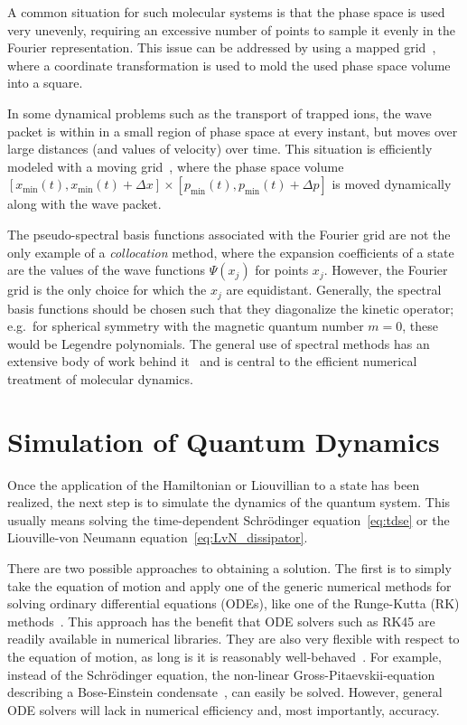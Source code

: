 A common situation for such molecular systems is that the phase space is used
very unevenly, requiring an excessive number of points to sample it evenly in
the Fourier representation. This issue can be addressed by using a mapped
grid~\cite{FattalPRE96,KokooulineJCP99,NestCPL02,WillnerJCP04,KallushCPL06},
where a coordinate transformation is used to mold the used phase space volume
into a square.

In some dynamical problems such as the transport of trapped ions, the wave
packet is within in a small region of phase space at every instant, but moves
over large distances (and values of velocity) over time. This situation is
efficiently modeled with a moving grid~\cite{SingerRMP10,FuerstNJP2014}, where
the phase space volume $[x_{\min}(t), x_{\min}(t)+\Delta x] \times [p_{\min}(t),
p_{\min}(t) + \Delta p]$  is moved dynamically along with the wave packet.

The pseudo-spectral basis functions associated with the Fourier grid are not
the only example of a \emph{collocation} method, where the expansion
coefficients of a state are the values of the wave functions $\Psi(x_j)$ for
points $x_j$. However, the Fourier grid is the only choice for which the $x_j$
are equidistant. Generally, the spectral basis functions should be chosen such
that they diagonalize the kinetic operator; e.g.\ for spherical symmetry with
the magnetic quantum number $m=0$, these would be Legendre polynomials.
The general use of spectral methods has an extensive body of work behind
it~\cite{BoydSpectral} and is central to the efficient numerical treatment of
molecular dynamics.


\section{Simulation of Quantum Dynamics}

Once the application of the Hamiltonian or Liouvillian to a state has been
realized, the next step is to simulate the dynamics of the quantum system. This
usually means solving the time-dependent Schrödinger equation~\eqref{eq:tdse} or
the Liouville-von Neumann equation~\eqref{eq:LvN_dissipator}.

There are two possible approaches to obtaining a solution. The first is to
simply take the equation of motion and apply one of the generic numerical
methods for solving ordinary differential
equations (ODEs), like one of the Runge-Kutta (RK)
methods~\cite{LambertODEBook,NumRecipesFortran}.
%
This approach has the benefit that ODE solvers such as RK45 are readily
available in numerical libraries. They are also very flexible
with respect to the equation of motion, as long is it is reasonably
well-behaved~\cite{LambertODEBook}. For example, instead of the Schrödinger
equation, the non-linear Gross-Pitaevskii-equation describing a Bose-Einstein
condensate~\cite{LeggettRMP2001}, can easily be solved. However, general ODE
solvers will lack in numerical efficiency and, most importantly, accuracy.

